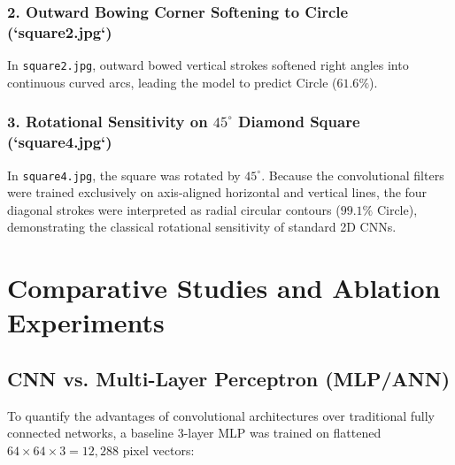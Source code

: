 \documentclass[11pt,a4paper,oneside]{report}
\begin{document}
\subsection{2. Outward Bowing Corner Softening to Circle (`square2.jpg`)}
In \texttt{square2.jpg}, outward bowed vertical strokes softened right angles into continuous curved arcs, leading the model to predict Circle ($61.6\%$).

\subsection{3. Rotational Sensitivity on \texorpdfstring{$45^\circ$}{45-Degree} Diamond Square (`square4.jpg`)}
In \texttt{square4.jpg}, the square was rotated by $45^\circ$. Because the convolutional filters were trained exclusively on axis-aligned horizontal and vertical lines, the four diagonal strokes were interpreted as radial circular contours ($99.1\%$ Circle), demonstrating the classical rotational sensitivity of standard 2D CNNs.

\chapter{Comparative Studies and Ablation Experiments}

\section{CNN vs. Multi-Layer Perceptron (MLP/ANN)}
To quantify the advantages of convolutional architectures over traditional fully connected networks, a baseline 3-layer MLP was trained on flattened $64\times 64\times 3 = 12,288$ pixel vectors:

\begin{table}[H]
\centering
\caption{Performance Comparison: CNN vs. Dense MLP (ANN).}
\label{tab:cnn_vs_mlp}
\end{table}
\end{document}
